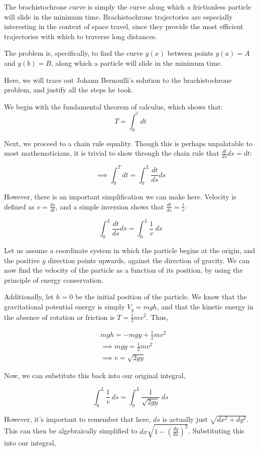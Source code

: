 \documentclass[%
 preprint,
 amsmath,amssymb,
 aps,
 pra,
 fleqn,
]{revtex4-2}
\begin{document}
The brachistochrone curve is simply the curve along which a frictionless particle will slide in the minimum time.  Brachistochrone trajectories are especially interesting in the context of space travel, since they provide the most efficient trajectories with which to traverse long distances.

The problem is, specifically, to find the curve $y(x)$ between points $y(a) = A$ and $y(b) = B$, along which a particle will slide in the minimum time.

Here, we will trace out Johann Bernoulli's solution to the brachistochrone problem, and justify all the steps he took.

We begin with the fundamental theorem of calculus, which shows that:
\[T = \int_0^t dt\]

Next, we proceed to a chain rule equality.  Though this is perhaps unpalatable to most mathematicians, it is trivial to show through the chain rule that $\frac{dt}{ds} ds = dt$:

\[\implies \int_0^T dt = \int_0^L \frac{dt}{ds} ds\]

However, there is an important simplification we can make here.  Velocity is defined as $v = \frac{ds}{dt}$, and a simple inversion shows that $\frac{dt}{ds} = \frac 1v$:

\[\int_0^L \frac{dt}{ds} ds = \int_0^L \frac 1v ~ ds\]

Let us assume a coordinate system in which the particle begins at the origin, and the positive $y$ direction points upwards, against the direction of gravity.  We can now find the velocity of the particle as a function of its position, by using the principle of energy conservation.

Additionally, let $h = 0$ be the initial position of the particle.  We know that the gravitational potential energy is simply $V_g = mgh$, and that the kinetic energy in the absence of rotation or friction is $T = \frac12 mv^2$.  Thus,

\begin{align*}
    &mgh = -mgy + \frac12 mv^2\\
    &\implies mgy = \frac12 mv^2\\
    &\implies v = \sqrt{2gy}
\end{align*}

Now, we can substitute this back into our original integral,

\[\int_0^L \frac 1v ~ ds = \int_0^L \frac{1}{\sqrt{2gy}} ~ ds\]

However, it's important to remember that here, $ds$ is actually just $\sqrt{dx^2 + dy^2}$.  This can then be algebraically simplified to $dx\sqrt{1 - \left(\frac{dy}{dx}\right)^2}$.  Substituting this into our integral,
\end{document}
